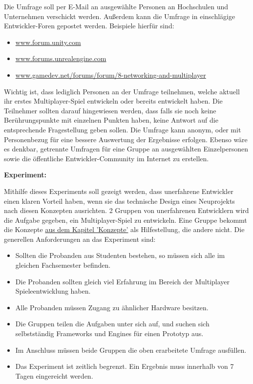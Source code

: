 Die Umfrage soll per E-Mail an ausgewählte Personen an Hochschulen und Unternehmen verschickt werden. Außerdem kann die Umfrage in einschlägige Entwickler-Foren gepostet werden. Beispiele hierfür sind:
\begin{itemize}
	\item \href{www.forum.unity.com}{www.forum.unity.com}
	\item \href{www.forums.unrealengine.com}{www.forums.unrealengine.com}
	\item \href{www.gamedev.net/forums/forum/8-networking-and-multiplayer}{www.gamedev.net/forums/forum/8-networking-and-multiplayer}
\end{itemize}

Wichtig ist, dass lediglich Personen an der Umfrage teilnehmen, welche aktuell ihr erstes Multiplayer-Spiel entwickeln oder bereits entwickelt haben. Die Teilnehmer sollten darauf hingewiesen werden, dass falls sie noch keine Berührungspunkte mit einzelnen Punkten haben, keine Antwort auf die entsprechende Fragestellung geben sollen. Die Umfrage kann anonym, oder mit Personenbezug für eine bessere Auswertung der Ergebnisse erfolgen. Ebenso wäre es denkbar, getrennte Umfragen für eine Gruppe an ausgewählten Einzelpersonen sowie die öffentliche Entwickler-Community im Internet zu erstellen.

\textbf{Experiment:}

Mithilfe dieses Experiments soll gezeigt werden, dass unerfahrene Entwickler einen klaren Vorteil haben, wenn sie das technische Design eines Neuprojekts nach diesen Konzepten ausrichten. 2 Gruppen von unerfahrenen Entwicklern wird die Aufgabe gegeben, ein Multiplayer-Spiel zu entwickeln. Eine Gruppe bekommt die Konzepte \hyperref[sec:konzepte]{aus dem Kapitel 'Konzepte'} als Hilfestellung, die andere nicht. Die generellen Anforderungen an das Experiment sind:

\begin{itemize}
	\item Sollten die Probanden aus Studenten bestehen, so müssen sich alle im gleichen Fachsemester befinden.
	\item Die Probanden sollten gleich viel Erfahrung im Bereich der Multiplayer Spieleentwicklung haben.
	\item Alle Probanden müssen Zugang zu ähnlicher Hardware besitzen.
	\item Die Gruppen teilen die Aufgaben unter sich auf, und suchen sich selbstständig Frameworks und Engines für einen Prototyp aus.
	\item Im Anschluss müssen beide Gruppen die oben erarbeitete Umfrage ausfüllen.
	\item Das Experiment ist zeitlich begrenzt. Ein Ergebnis muss innerhalb von 7 Tagen eingereicht werden. 
\end{itemize}

